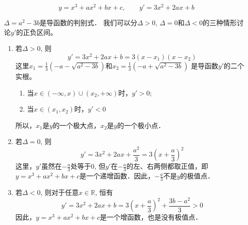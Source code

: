 \begin{solution}
\[y=x^3+ax^2+bx+c,\qquad 
    y'=3x^2+2ax+b\]

$ \Delta=a^2-3b$是导函数的判别式．
    我们可以分$\Delta>0$, $\Delta=0$和$\Delta<0$的三种情形讨论$y'$的正负区间。
\begin{enumerate}
    \item 若$\Delta>0$, 则
\[    y'=3x^2+2ax+b=3 (x-x_1) (x-x_2)\]
    这里$x_1=\frac{1}{3}\left(-a-\sqrt{a^2-3b}\right)$和$x_2=\frac{1}{3}\left(-a+\sqrt{a^2-3b}\right)$
    是导函数$y'$的二个实根。
\begin{enumerate}
    \item 当$x\in (-\infty,x)\cup (x_2,+\infty)$时，$y'>0$;
    \item 当$x\in (x_1,x_2)$时，$y'<0$
\end{enumerate}
    所以，$x_1$是$y$的一个极大点，$x_2$是$y$的一个极小点．
    
\item 若$\Delta=0$, 则
    \[y'=3x^2+2ax+\frac{a^2}{3}=3\left(x+\frac{a}{3}\right)^2\]
这里，$y'$虽然在$-\frac{a}{3}$处等于0, 但$y'$在$-\frac{a}{3}$的左、右两侧都取正值，即$y=x^3+ax^2+bx+c$是一个递增函数．因此，$-\frac{a}{3}$不是$y$的极值点．
\item 若$\Delta<0$, 则对于任意$x\in\mathbb{R}$, 恒有\[y'=3x^2+2ax+b=3 \left(x+\frac{a}{3}\right)^2+\frac{3b-a^2}{3}> 0\]
因此，$y=x^3+ax^2+bx+c$是一个增函数，也是没有极值点．
\end{enumerate}    
\end{solution}

